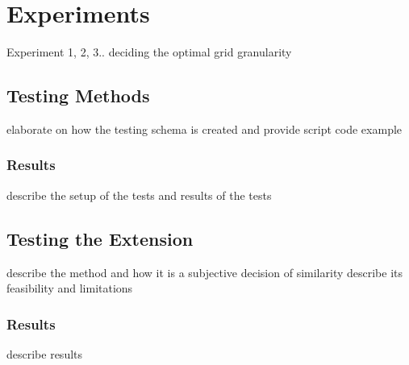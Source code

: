 
\chapter{Experiments} %
Experiment 1, 2, 3.. deciding the optimal grid granularity 

\section{Testing Methods}
elaborate on how the testing schema is created and provide script code example

\subsection{Results}
describe the setup of the tests and results of the tests

\section{Testing the Extension}
describe the method and how it is a subjective decision of similarity
describe its feasibility and limitations

\subsection{Results}
describe results

\ifpdf
    \graphicspath{{X/figures/PNG/}{X/figures/PDF/}{X/figures/}}
\else
    \graphicspath{{X/figures/EPS/}{X/figures/}}
\fi









